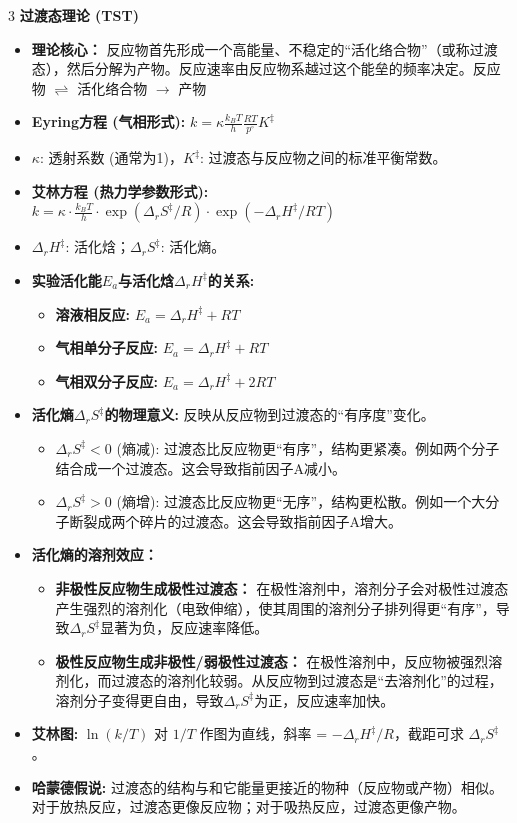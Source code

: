 \documentclass[a4paper,6pt]{article} %
\begin{document}
\begin{multicols}{3}
\textbf{过渡态理论 (TST)}
\begin{itemize}
    \item \textbf{理论核心：} 反应物首先形成一个高能量、不稳定的“活化络合物”（或称过渡态），然后分解为产物。反应速率由反应物系越过这个能垒的频率决定。反应物 $\rightleftharpoons$ 活化络合物 $\to$ 产物
    \item \textbf{Eyring方程 (气相形式):} $k = \kappa \frac{k_B T}{h} \frac{RT}{p^\circ} K^\ddagger$
    \item $\kappa$: 透射系数 (通常为1)，$K^\ddagger$: 过渡态与反应物之间的标准平衡常数。
    \item \textbf{艾林方程 (热力学参数形式):} $k = \kappa \cdot \frac{k_B T}{h} \cdot \exp(\Delta_r S^\ddagger / R) \cdot \exp(-\Delta_r H^\ddagger / RT)$
    \item $\Delta_r H^\ddagger$: 活化焓；$\Delta_r S^\ddagger$: 活化熵。
    \item \textbf{实验活化能$E_a$与活化焓$\Delta_r H^\ddagger$的关系:}
    \begin{itemize}
        \item \textbf{溶液相反应:} $E_a = \Delta_r H^\ddagger + RT$
        \item \textbf{气相单分子反应:} $E_a = \Delta_r H^\ddagger + RT$
        \item \textbf{气相双分子反应:} $E_a = \Delta_r H^\ddagger + 2RT$
    \end{itemize}
    \item \textbf{活化熵$\Delta_r S^\ddagger$的物理意义:} 反映从反应物到过渡态的“有序度”变化。
    \begin{itemize}
        \item $\Delta_r S^\ddagger < 0$ (熵减): 过渡态比反应物更“有序”，结构更紧凑。例如两个分子结合成一个过渡态。这会导致指前因子A减小。
        \item $\Delta_r S^\ddagger > 0$ (熵增): 过渡态比反应物更“无序”，结构更松散。例如一个大分子断裂成两个碎片的过渡态。这会导致指前因子A增大。
    \end{itemize}
    \item \textbf{活化熵的溶剂效应：}
    \begin{itemize}
        \item \textbf{非极性反应物生成极性过渡态：} 在极性溶剂中，溶剂分子会对极性过渡态产生强烈的溶剂化（电致伸缩），使其周围的溶剂分子排列得更“有序”，导致$\Delta_r S^\ddagger$显著为负，反应速率降低。
        \item \textbf{极性反应物生成非极性/弱极性过渡态：} 在极性溶剂中，反应物被强烈溶剂化，而过渡态的溶剂化较弱。从反应物到过渡态是“去溶剂化”的过程，溶剂分子变得更自由，导致$\Delta_r S^\ddagger$为正，反应速率加快。
    \end{itemize}
    \item \textbf{艾林图:} $\ln(k/T)$ 对 $1/T$ 作图为直线，斜率 = $-\Delta_r H^\ddagger/R$，截距可求 $\Delta_r S^\ddagger$。
    \item \textbf{哈蒙德假说:} 过渡态的结构与和它能量更接近的物种（反应物或产物）相似。对于放热反应，过渡态更像反应物；对于吸热反应，过渡态更像产物。
\end{itemize}


\end{multicols}
\end{document}
